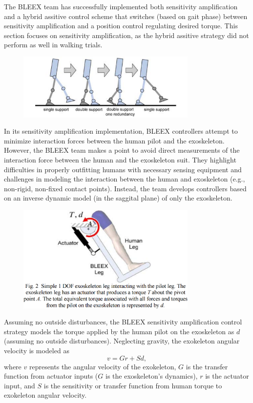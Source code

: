 The BLEEX team has successfully implemented both sensitivity amplification \cite{sesitivityAmpPaper2005} and a hybrid assitive control scheme \cite{bleex_hybrid_control_2006} that switches (based on gait phase) between sensitivity amplification and a position control regulating desired torque. This section focuses on sensitivity amplification, as the hybrid assitive strategy did not perform as well in walking trials.

\begin{figure}[ht]
  \centering
  \includegraphics[width=3.5in]{exos/figs/bleex_support_phases.png}
\end{figure}

In its sensitivity amplification implementation, BLEEX controllers attempt to minimize interaction forces between the human pilot and the exoskeleton. However, the BLEEX team makes a point to avoid direct measurements of the interaction force between the human and the exoskeleton suit.  They highlight difficulties in properly outfitting humans with necessary sensing equipment and challenges in modeling the interaction between the human and exoskeleton (e.g., non-rigid, non-fixed contact points).  Instead, the team develops controllers based on an inverse dynamic model (in the saggital plane) of only the exoskeleton.  

\begin{figure}[ht]
  \centering
  \includegraphics[width=3.5in]{exos/figs/bleex_1dof_ex.png}
\end{figure}

Assuming no outside disturbances, the BLEEX sensitivity amplification control strategy models the torque applied by the human pilot on the exoskeleton as $d$ (assuming no outside disturbances).   Neglecting gravity, the exokeleton angular velocity is modeled as 
\[v = G r + S d ,\] 
where $v$ represents the angular velocity of the exokeleton, $G$ is the transfer function from actuator inputs ($G$ is the exoskeleton's dynamics), $r$ is the actuator input, and $S$ is the sensitivity or transfer function from human torque to exokeleton angular velocity. 

